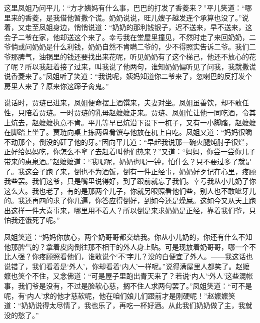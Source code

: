 \documentclass[12pt,oneside]{book}
\begin{document}
这里凤姐乃问平儿：“方才姨妈有什么事，巴巴的打发了香菱来？”平儿笑道：“哪里来的香菱，是我借他暂撒个谎。奶奶说说，旺儿嫂子越发连个承算也没了。”说着，又走至凤姐身边，悄悄说道：“奶奶的那利钱银子，迟不送来，早不送来，这会子二爷在家，他却送这个来了。幸亏我在堂屋里撞见，不然时走了来回奶奶，二爷倘或问奶奶是什么利钱，奶奶自然不肯瞒二爷的，少不得照实告诉二爷。我们二爷那脾气，油锅里的钱还要找出来花呢，听见奶奶有了这个梯己，他还不放心的花了呢？所以我赶着接了过来，叫我说了他两句，谁知奶奶偏听见了问我，我就撒谎说香菱来了。”凤姐听了笑道：“我说呢，姨妈知道你二爷来了，忽喇巴的反打发个房里人来了？原来你这蹄子肏鬼。”

说话时，贾琏已进来，凤姐便命摆上酒馔来，夫妻对坐。凤姐虽善饮，却不敢任性，只陪着贾琏。一时贾琏的乳母赵嬷嬷走来。贾琏、凤姐忙让他一同吃酒，令其上炕去，赵嬷嬷执意不肯。平儿等早已炕沿下设下一杌子，又有一小脚踏，赵嬷嬷在脚踏上坐了。贾琏向桌上拣两盘肴馔与他放在杌上自吃。凤姐又道：“妈妈很嚼不动那个，倒没的矼了他的牙。”因向平儿道：“早起我说那一碗火腿炖肘子很烂，正好给妈妈吃，你怎么不拿了去赶着叫他们热来？”又道：“妈妈，你尝一尝你儿子带来的惠泉酒。”赵嬷嬷道：“我喝呢，奶奶也喝一钟，怕什么？只不要过多了就是了。我这会子跑了来，倒也不为酒饭，倒有一件正经事，奶奶好歹记在心里，疼顾我些罢。我们这爷，只是嘴里说得好，到了跟前就忘了我们。幸亏我从小儿奶了你这么大。我也老了，有的是那两个儿子，你就另眼照看他们些，别人也不敢呲牙儿的。我还再四的求了你几遍，你答应得倒好，到如今还是燥屎。这如今又从天上跑出这样一件大喜事来，哪里用不着人？所以倒是来求奶奶是正经，靠着我们爷，只怕我还饿死了呢。”

凤姐笑道：“妈妈你放心，两个奶哥哥都交给我。你从小儿奶的，你还有什么不知他那脾气的？拿着皮肉倒往那不相干的外人身上贴。可是现放着奶哥哥，哪一个不比人强？你疼顾照看他们，谁敢说个‘不’字儿？没的白便宜了外人。——我这话也说错了，我们看着是‘外人’，你却看着‘内人’一样呢。”说得满屋里人都笑了。赵嬷嬷也笑个不住，又念佛道：“可是屋子里跑出青天来了？若说‘内人’‘外人’这些混帐事，我们爷是没有，不过是脸软心慈，搁不住人求两句罢了。”凤姐笑道：“可不是呢，有‘内人’求的他才慈软呢，他在咱们娘儿们跟前才是刚硬呢！”赵嬷嬷笑道：“奶奶说得太尽情了，我也乐了，再吃一杯好酒。从此我们奶奶做了主，我就没的愁了。”
\end{document}
